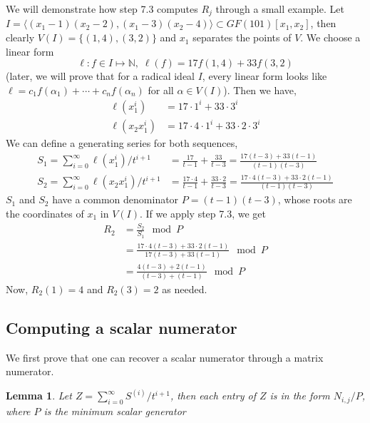 \documentclass[12pt]{article}
\newtheorem{lemma}[definition]{Lemma}
\begin{document}
We will demonstrate how step 7.3 computes $R_j$ through
a small example. Let 
$I = \langle (x_1-1)(x_2-2),(x_1-3)(x_2-4)\rangle \subset
GF(101)[x_1,x_2]$, then
clearly $V(I) = \{ (1,4),(3,2) \}$ and $x_1$ separates the
points of $V$. We choose a linear form 
$$\ell: f \in I \mapsto \mathbb{N},\;\ell(f) = 17 f(1,4) + 33 f(3,2)$$
(later, we will prove that for a 
radical ideal $I$, every linear form looks like 
$\ell = c_1 f(\alpha_1) + \cdots + c_n f(\alpha_n) $ for all
$\alpha \in V(I)$). Then we have,
\begin{align*}
\ell(x_1^i) &= 17 \cdot 1^i + 33 \cdot 3^i\\
\ell(x_2x_1^i) &= 17 \cdot 4 \cdot 1^i + 33 \cdot 2 \cdot 3^i
\end{align*} 
We can define a generating series for both sequences,
\begin{align*}
S_1 = \sum_{i = 0}^{\infty} \ell(x^i_1) / t^{i+1}
 &= \frac{17}{t-1} + \frac{33}{t-3}
 = \frac{17(t-3)+33(t-1)}{(t-1)(t-3)} \\
S_2 = \sum_{i=0}^{\infty} \ell(x_2x^i_1)/t^{i+1} 
&= \frac{17\cdot 4}{t-1} + \frac{33 \cdot 2}{t-3}
= \frac{17\cdot 4 (t-3) + 33\cdot 2(t-1)}{(t-1)(t-3)}
\end{align*}
$S_1$ and $S_2$ have a common denominator $P = (t-1)(t-3)$,
whose roots are the coordinates of $x_1$ in $V(I)$. If we
apply step 7.3, we get
\begin{align*}
R_2 
&=\frac{S_2}{S_1} \mod P\\
 &= 
\frac{17\cdot 4 (t-3) + 33\cdot 2(t-1)}{17(t-3)+33(t-1)} \mod P\\
&=\frac{4 (t-3) + 2(t-1)}{(t-3)+(t-1)} \mod P
\end{align*}
Now, $ R_2(1) = 4$ and $R_2(3) = 2$ as needed.

\subsection{Computing a scalar numerator}
We first prove that one can recover a scalar numerator
through a matrix numerator.
\begin{lemma}\label{gen}
	Let $Z = \sum_{i=0}^{\infty} S^{(i)}/t^{i+1}$, then each
	entry of $Z$ is in the form $N_{i,j}/P$, where $P$ is
	the minimum scalar generator
\end{lemma} 
\end{document}
